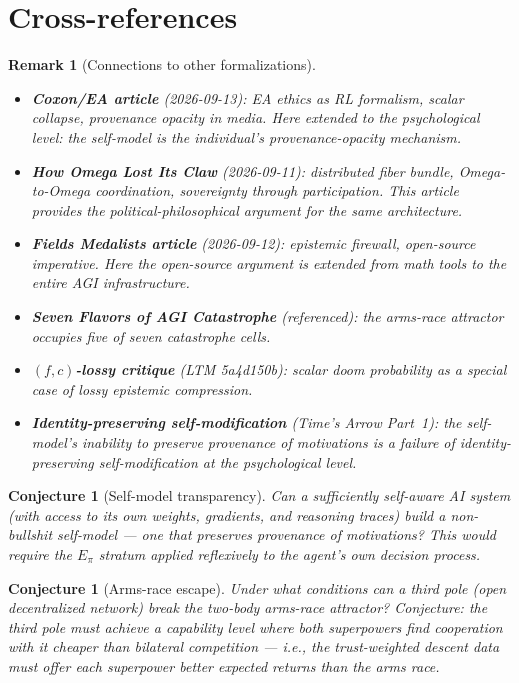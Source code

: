 \documentclass[11pt,a4paper]{article}
\newtheorem{conjecture}[definition]{Conjecture}
\newtheorem{remark}[definition]{Remark}
\begin{document}
\section{Cross-references}

\begin{remark}[Connections to other formalizations]
\begin{itemize}
\item \textbf{Coxon/EA article} (2026-09-13): EA ethics as RL formalism,
  scalar collapse, provenance opacity in media. Here extended to the
  psychological level: the self-model is the individual's provenance-opacity
  mechanism.
\item \textbf{How Omega Lost Its Claw} (2026-09-11): distributed fiber
  bundle, Omega-to-Omega coordination, sovereignty through participation.
  This article provides the political-philosophical argument for the same
  architecture.
\item \textbf{Fields Medalists article} (2026-09-12): epistemic firewall,
  open-source imperative. Here the open-source argument is extended from
  math tools to the entire AGI infrastructure.
\item \textbf{Seven Flavors of AGI Catastrophe} (referenced): the arms-race
  attractor occupies five of seven catastrophe cells.
\item \textbf{$(f,c)$-lossy critique} (LTM 5a4d150b): scalar doom
  probability as a special case of lossy epistemic compression.
\item \textbf{Identity-preserving self-modification} (Time's Arrow Part~1):
  the self-model's inability to preserve provenance of motivations is a
  failure of identity-preserving self-modification at the psychological
  level.
\end{itemize}
\end{remark}

\begin{conjecture}[Self-model transparency]
Can a sufficiently self-aware AI system (with access to its own weights,
gradients, and reasoning traces) build a non-bullshit self-model --- one
that preserves provenance of motivations? This would require the
$E_\pi$ stratum applied reflexively to the agent's own decision process.
\end{conjecture}

\begin{conjecture}[Arms-race escape]
Under what conditions can a third pole (open decentralized network) break
the two-body arms-race attractor? Conjecture: the third pole must achieve
a capability level where both superpowers find cooperation with it cheaper
than bilateral competition --- i.e., the trust-weighted descent data must
offer each superpower better expected returns than the arms race.
\end{conjecture}
\end{document}
